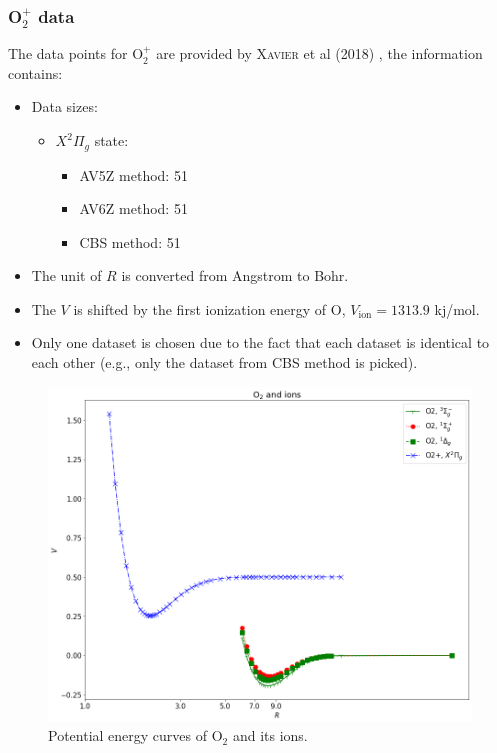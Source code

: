 \documentclass[12pt]{article}
\begin{document}
\subsubsection{O$_2^+$ data}
The data points for O$_2^+$ are provided by \textsc{Xavier} et al (2018) \cite{idx174}, the information contains:
\begin{itemize}
    \item Data sizes:
    \begin{itemize}
        \item $X^2\Pi_g$ state:
        \begin{itemize} 
            \item AV5Z method: 51
            \item AV6Z method: 51
            \item CBS method: 51
        \end{itemize}
    \end{itemize}
    \item The unit of $R$ is converted from Angstrom to Bohr.
    \item The $V$ is shifted by the first ionization energy of O, $V_{\text{ion}} = 1313.9$ kj/mol.
    \item Only one dataset is chosen due to the fact that each dataset is identical to each other (e.g., only the dataset from CBS method is picked).
\end{itemize}
\begin{figure}[h]
    \centering
    \includegraphics[scale=0.55]{img/O2_and_ions.png}
    \caption{Potential energy curves of O$_2$ and its ions.}
    \label{fig:o2}
\end{figure}
\end{document}
